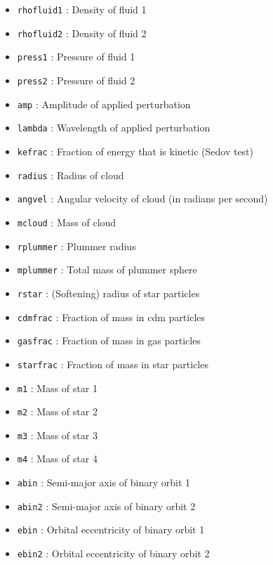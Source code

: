 \documentclass[a4paper]{article}
\newcommand{\var}[1]{\texttt{#1}}
\begin{document}
\begin{itemize}
\item \var{rhofluid1}    : Density of fluid 1
\item \var{rhofluid2}    : Density of fluid 2

\item \var{press1}       : Pressure of fluid 1
\item \var{press2}       : Pressure of fluid 2

\item \var{amp}          : Amplitude of applied perturbation
\item \var{lambda}       : Wavelength of applied perturbation

\item \var{kefrac}       : Fraction of energy that is kinetic (Sedov test)
\item \var{radius}       : Radius of cloud
\item \var{angvel}       : Angular velocity of cloud (in radians per second)
\item \var{mcloud}       : Mass of cloud

\item \var{rplummer}     : Plummer radius
\item \var{mplummer}     : Total mass of plummer sphere

\item \var{rstar}        : (Softening) radius of star particles

\item \var{cdmfrac}      : Fraction of mass in cdm particles
\item \var{gasfrac}      : Fraction of mass in gas particles
\item \var{starfrac}     : Fraction of mass in star particles

\item \var{m1}           : Mass of star 1
\item \var{m2}           : Mass of star 2
\item \var{m3}           : Mass of star 3
\item \var{m4}           : Mass of star 4

\item \var{abin}         : Semi-major axis of binary orbit 1
\item \var{abin2}        : Semi-major axis of binary orbit 2
\item \var{ebin}         : Orbital eccentricity of binary orbit 1
\item \var{ebin2}        : Orbital eccentricity of binary orbit 2


\end{itemize}
\end{document}
